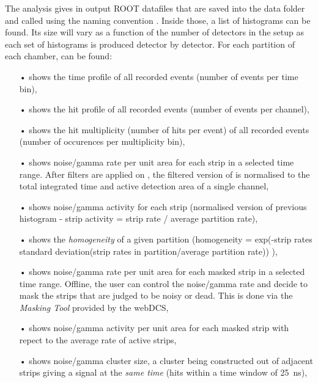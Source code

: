 	The analysis gives in output ROOT datafiles that are saved into the data folder and called using the naming convention . Inside those, a list of  histograms can be found. Its size will vary as a function of the number of detectors in the setup as each set of histograms is produced detector by detector. For each partition of each chamber, can be found:

	\begin{itemize}
		\item[•]  shows the time profile of all recorded events (number of events per time bin),
		\item[•]  shows the hit profile of all recorded events (number of events per channel),
		\item[•]  shows the hit multiplicity (number of hits per event) of all recorded events (number of occurences per multiplicity bin),
		\item[•]  shows noise/gamma rate per unit area for each strip in a selected time range. After filters are applied on , the filtered version of  is normalised to the total integrated time and active detection area of a single channel,
		\item[•]  shows noise/gamma activity for each strip (normalised version of previous histogram - strip activity = strip rate / average partition rate),
		\item[•]  shows the \textit{homogeneity} of a given partition (homogeneity = exp(-strip rates standard deviation(strip rates in partition/average partition rate)) ),
		\item[•]  shows noise/gamma rate per unit area for each masked strip in a selected time range. Offline, the user can control the noise/gamma rate and decide to mask the strips that are judged to be noisy or dead. This is done via the \textit{Masking Tool} provided by the webDCS,
		\item[•]  shows noise/gamma activity per unit area for each masked strip with repect to the average rate of active strips,
		\item[•]  shows noise/gamma cluster size, a cluster being constructed out of adjacent strips giving a signal at the \textit{same time} (hits within a time window of \SI{25}{ns}),

\end{itemize}
